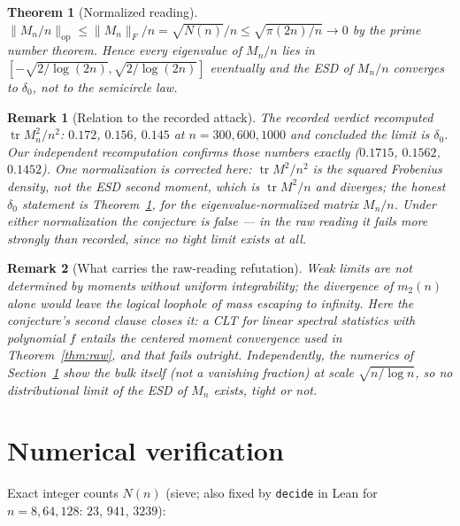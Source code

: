 \documentclass[11pt]{article}
\newtheorem{theorem}{Theorem}
\newtheorem{remark}{Remark}
\begin{document}
\begin{theorem}[Normalized reading]\label{thm:norm}
$\|M_n/n\|_{\mathrm{op}}\le\|M_n\|_F/n=\sqrt{N(n)}/n\le\sqrt{\pi(2n)/n}\to0$ by the
prime number theorem. Hence every eigenvalue of $M_n/n$ lies in
$[-\sqrt{2/\log(2n)},\sqrt{2/\log(2n)}]$ eventually and the ESD of $M_n/n$ converges to
$\delta_0$, not to the semicircle law.
\end{theorem}

\begin{remark}[Relation to the recorded attack]
The recorded verdict recomputed $\operatorname{tr}M_n^2/n^2$: $0.172$, $0.156$, $0.145$
at $n=300,600,1000$ and concluded the limit is $\delta_0$. Our independent recomputation
confirms those numbers exactly ($0.1715$, $0.1562$, $0.1452$). One normalization is
corrected here: $\operatorname{tr}M^2/n^2$ is the squared Frobenius density, not the ESD
second moment, which is $\operatorname{tr}M^2/n$ and diverges; the honest $\delta_0$
statement is Theorem~\ref{thm:norm}, for the eigenvalue-normalized matrix $M_n/n$. Under
either normalization the conjecture is false --- in the raw reading it fails more
strongly than recorded, since no tight limit exists at all.
\end{remark}

\begin{remark}[What carries the raw-reading refutation]
Weak limits are not determined by moments without uniform integrability; the divergence
of $m_2(n)$ alone would leave the logical loophole of mass escaping to infinity. Here
the conjecture's second clause closes it: a CLT for linear spectral statistics with
polynomial $f$ entails the centered moment convergence used in
Theorem~\ref{thm:raw}, and that fails outright. Independently, the numerics of
Section~\ref{sec:num} show the bulk itself (not a vanishing fraction) at scale
$\sqrt{n/\log n}$, so no distributional limit of the ESD of $M_n$ exists, tight or not.
\end{remark}

\section{Numerical verification}\label{sec:num}

Exact integer counts $N(n)$ (sieve; also fixed by \texttt{decide} in Lean for
$n=8,64,128$: $23$, $941$, $3239$):
\end{document}
